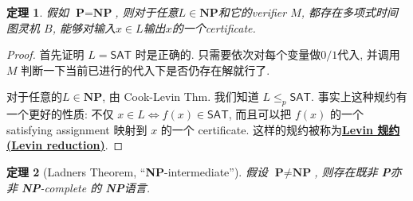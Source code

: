\documentclass[8pt]{article}
\theoremstyle{compact}
\newtheorem{theorem}{定理}[section]
\def\obj#1{\textbf{\uline{#1}}}
\def\le{\leqslant}
\def\P{\textbf{P}}
\def\NP{\textbf{NP}}
\begin{document}
\begin{theorem}
	假如 $\P = \NP$, 则对于任意$L \in \NP$和它的verifier $M$, 都存在多项式时间图灵机 $B$, 能够对输入$x \in L$输出$x$的一个certificate.
\end{theorem}
\begin{proof}
	首先证明 $L = \textsf{SAT}$ 时是正确的. 只需要依次对每个变量做$0/1$代入, 并调用 $M$ 判断一下当前已进行的代入下是否仍存在解就行了.

	对于任意的$L \in \NP$, 由 Cook-Levin Thm. 我们知道 $L \le_p \textsf{SAT}$. 事实上这种规约有一个更好的性质: 不仅 $x \in L \Leftrightarrow f(x) \in \textsf{SAT}$, 而且可以把 $f(x)$ 的一个 satisfying assignment 映射到 $x$ 的一个 certificate. 这样的规约被称为\obj{Levin 规约(Levin reduction)}.
\end{proof}
\begin{theorem}[Ladners Theorem, “\NP-intermediate”]
	假设 $\P \neq \NP$, 则存在既非 \P 亦非 \NP-complete 的 \NP 语言.
\end{theorem}
\end{document}
